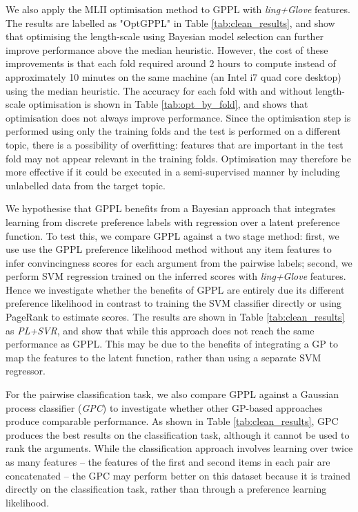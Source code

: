 We also apply the MLII optimisation method to GPPL with \emph{ling+Glove} features. The results are labelled as "OptGPPL" in Table \ref{tab:clean_results}, and show that 
optimising the length-scale using Bayesian model selection can further improve performance
above the median heuristic. However, the cost of these improvements is that each fold required around 2 hours to compute instead of approximately 10 minutes on the same machine (an Intel i7 quad core desktop) using the median heuristic. The accuracy for each fold with and without length-scale optimisation is shown in 
Table \ref{tab:opt_by_fold}, and shows that optimisation does not always improve performance. 
Since the optimisation step is performed using only the training folds and the test is performed 
on a different topic, there is a possibility of overfitting: features that are important in the 
test fold may not appear relevant in the training folds. 
Optimisation may therefore be more effective if it could be 
executed in a semi-supervised manner by including unlabelled data from the target topic.

We hypothesise that GPPL benefits from a Bayesian approach that integrates learning from
discrete preference labels with regression over a latent preference function. To test this,
we compare GPPL against a two stage method: first, we use use the GPPL preference likelihood method without any item features to infer convincingness scores for each argument from the pairwise labels; second, we perform SVM regression trained on the inferred scores with \emph{ling+Glove} features.
Hence we investigate whether the benefits of GPPL are entirely due its different preference likelihood in contrast to training the SVM classifier directly or using PageRank to estimate scores.
 The results are shown in Table \ref{tab:clean_results} as \emph{PL+SVR}, 
 and show that while this approach does not reach the same performance as 
 GPPL. This may be due to the benefits of integrating a GP to map the features to the latent
 function, rather than using a separate SVM regressor.
 
For the pairwise classification task, we also compare GPPL against a Gaussian process classifier (\emph{GPC}) to investigate whether other GP-based approaches produce comparable performance. As shown in Table \ref{tab:clean_results}, GPC produces the best results on the classification task, although it cannot be used
to rank the arguments.
While the classification approach involves learning over twice as many features -- the features of the first and second items in each pair are concatenated -- the GPC may perform better on this dataset 
because it is trained directly on the classification task, rather than through a preference learning likelihood. 

